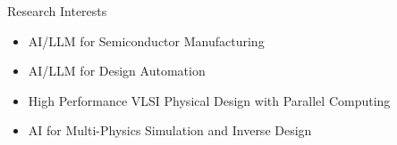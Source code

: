 
\begin{rSection}{Research Interests}
\begin{itemize}
 \item AI/LLM for Semiconductor Manufacturing
 \item AI/LLM for Design Automation
 \item High Performance VLSI Physical Design with Parallel Computing
 \item AI for Multi-Physics Simulation and Inverse Design
\end{itemize}
\end{rSection}



